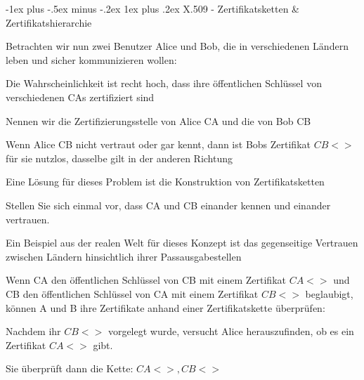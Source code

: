 \documentclass[a4paper]{article}
\makeatletter
\renewcommand{\subsubsection}{\@startsection{subsubsection}{3}{0mm}%
 {-1ex plus -.5ex minus -.2ex}%
 {1ex plus .2ex}%
 {\normalfont\small\bfseries}}
\makeatother
\begin{document}
\begin{multicols}{3}
      \subsubsection{X.509 - Zertifikatsketten \& Zertifikatshierarchie}
      \begin{itemize*}
            \item Betrachten wir nun zwei Benutzer Alice und Bob, die in verschiedenen Ländern leben und sicher kommunizieren wollen:
            \begin{itemize*}
                  \item Die Wahrscheinlichkeit ist recht hoch, dass ihre öffentlichen Schlüssel von verschiedenen CAs zertifiziert sind
                  \item Nennen wir die Zertifizierungsstelle von Alice CA und die von Bob CB
                  \item Wenn Alice CB nicht vertraut oder gar kennt, dann ist Bobs Zertifikat $CB<>$ für sie nutzlos, dasselbe gilt in der anderen Richtung
            \end{itemize*}
            \item Eine Lösung für dieses Problem ist die Konstruktion von Zertifikatsketten
            \begin{itemize*}
                  \item Stellen Sie sich einmal vor, dass CA und CB einander kennen und einander vertrauen.
                  \begin{itemize*}
                        \item Ein Beispiel aus der realen Welt für dieses Konzept ist das gegenseitige Vertrauen zwischen Ländern hinsichtlich ihrer Passausgabestellen
                  \end{itemize*}
                  \item Wenn CA den öffentlichen Schlüssel von CB mit einem Zertifikat $CA<>$ und CB den öffentlichen Schlüssel von CA mit einem Zertifikat $CB<>$ beglaubigt, können A und B ihre Zertifikate anhand einer Zertifikatskette überprüfen:
                  \begin{itemize*}
                        \item Nachdem ihr $CB<>$ vorgelegt wurde, versucht Alice herauszufinden, ob es ein Zertifikat $CA<>$ gibt.
                        \item Sie überprüft dann die Kette: $CA<>, CB<>$
                  \end{itemize*}
            \end{itemize*}

\end{itemize*}
\end{multicols}
\end{document}
